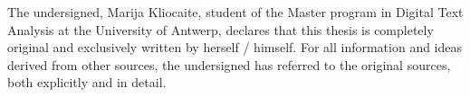 \thispagestyle{plain}
\begin{center}

The undersigned, Marija Kliocaite, student of the Master program in Digital Text Analysis at the University of Antwerp, declares that this thesis is completely original and exclusively written by herself / himself. For all information and ideas derived from other sources, the undersigned has referred to the original sources, both explicitly and in detail.
 
\end{center}
